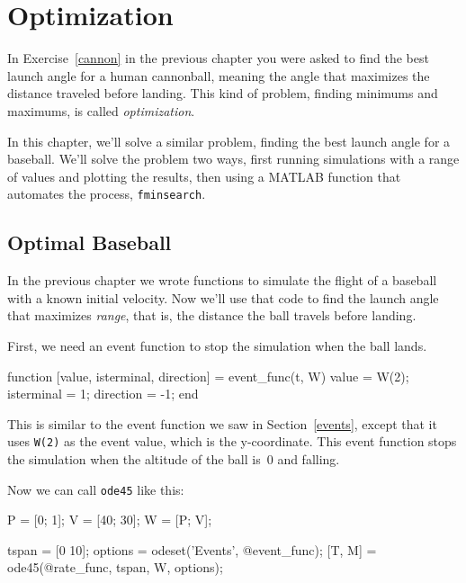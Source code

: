 \chapter{Optimization}


In Exercise~\ref{cannon} in the previous chapter you were asked to find the best launch angle for a human cannonball, meaning the angle that maximizes the distance traveled before landing.  This kind of problem, finding minimums and maximums, is called \emph{optimization}.

In this chapter, we'll solve a similar problem, finding the best launch angle for a baseball.
We'll solve the problem two ways, first running simulations with a range of values and plotting the results, then using a MATLAB function that automates the process, \lstinline{fminsearch}.

\section{Optimal Baseball}

In the previous chapter we wrote functions to simulate the flight of a baseball with a known initial velocity.  Now we'll use that code to find the launch angle that maximizes \emph{range}, that is, the distance the ball travels before landing.


First, we need an event function to stop the simulation when the ball lands.

\begin{code}
function [value, isterminal, direction] = event_func(t, W)
    value = W(2);
    isterminal = 1;
    direction = -1;
end
\end{code}


This is similar to the event function we saw in Section~\ref{events}, except that it uses \lstinline{W(2)} as the event value, which is the y-coordinate.  This event function stops the simulation when the altitude of the ball is~0 and falling.

Now we can call \lstinline{ode45} like this:

\begin{code}
    P = [0; 1];       %
    V = [40; 30];     %
    W = [P; V];       %

    tspan = [0 10];
    options = odeset('Events', @event_func);
    [T, M] = ode45(@rate_func, tspan, W, options);
\end{code}

